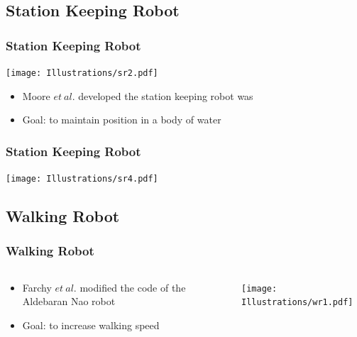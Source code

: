 \documentclass{beamer}
\begin{document}
\subsection{Station Keeping Robot}
\begin{frame}
  \frametitle{Station Keeping Robot}
\begin{center}
 \texttt{[image: Illustrations/sr2.pdf]}
       \\
\end{center}
\begin{itemize}
\item \large Moore $et~al.$ developed the station keeping robot was 
\item \large Goal: to maintain position in a body of water
\end{itemize}
\end{frame}

\begin{frame}
  \frametitle{Station Keeping Robot}
\begin{center}
 \texttt{[image: Illustrations/sr4.pdf]}
       \\
\end{center}

\end{frame}

\subsection{Walking Robot}
\begin{frame}
  \frametitle{Walking Robot}

\begin{columns}
  \begin{column}{0.5\textwidth}
\begin{itemize}
\item  Farchy $et~al.$ modified the code of the Aldebaran Nao robot
\item Goal: to increase walking speed
\end{itemize}
\end{column}
\begin{column}{0.5\textwidth}
 \texttt{[image: Illustrations/wr1.pdf]}
       \\
\end{column}
\end{columns}
\end{frame}
\end{document}
